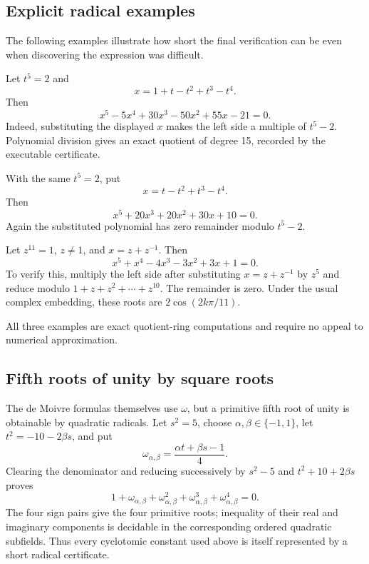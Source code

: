 \subsection{Explicit radical examples}

The following examples illustrate how short the final verification can be even
when discovering the expression was difficult.

\begin{example}
Let \(t^5=2\) and
\[
 x=1+t-t^2+t^3-t^4.
\]
Then
\begin{equation}\label{eq:explicit-example-one}
 x^5-5x^4+30x^3-50x^2+55x-21=0.
\end{equation}
Indeed, substituting the displayed \(x\) makes the left side a multiple of
\(t^5-2\).  Polynomial division gives an exact quotient of degree 15, recorded
by the executable certificate.
\end{example}

\begin{example}
With the same \(t^5=2\), put
\[
 x=t-t^2+t^3-t^4.
\]
Then
\begin{equation}\label{eq:young-example}
 x^5+20x^3+20x^2+30x+10=0.
\end{equation}
Again the substituted polynomial has zero remainder modulo \(t^5-2\).
\end{example}

\begin{example}
Let \(z^{11}=1\), \(z\ne1\), and \(x=z+z^{-1}\).  Then
\begin{equation}\label{eq:cos11-example}
 x^5+x^4-4x^3-3x^2+3x+1=0.
\end{equation}
To verify this, multiply the left side after substituting \(x=z+z^{-1}\) by
\(z^5\) and reduce modulo
\(1+z+z^2+\cdots+z^{10}\).  The remainder is zero.  Under the usual complex
embedding, these roots are \(2\cos(2k\pi/11)\).
\end{example}

All three examples are exact quotient-ring computations and require no appeal
to numerical approximation.

\subsection{Fifth roots of unity by square roots}

The de Moivre formulas themselves use \(\omega\), but a primitive fifth root of
unity is obtainable by quadratic radicals.  Let \(s^2=5\), choose
\(\alpha,\beta\in\{-1,1\}\), let
\(t^2=-10-2\beta s\), and put
\begin{equation}\label{eq:fifth-root-radical}
 \omega_{\alpha,\beta}
 =\frac{\alpha t+\beta s-1}{4}.
\end{equation}
Clearing the denominator and reducing successively by
\(s^2-5\) and \(t^2+10+2\beta s\) proves
\[
 1+\omega_{\alpha,\beta}+\omega_{\alpha,\beta}^2
 +\omega_{\alpha,\beta}^3+\omega_{\alpha,\beta}^4=0.
\]
The four sign pairs give the four primitive roots; inequality of their real and
imaginary components is decidable in the corresponding ordered quadratic
subfields.  Thus every cyclotomic constant used above is itself represented by
a short radical certificate.

